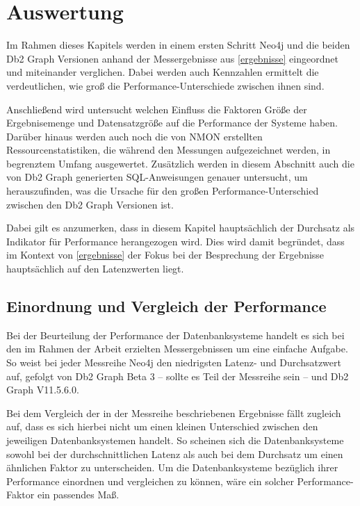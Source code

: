 \chapter{Auswertung}
\label{auswertung}
Im Rahmen dieses Kapitels werden in einem ersten Schritt Neo4j und die beiden Db2 Graph Versionen anhand der Messergebnisse aus \autoref{ergebnisse} eingeordnet und miteinander verglichen. Dabei werden auch Kennzahlen ermittelt die verdeutlichen, wie groß die Performance-Unterschiede zwischen ihnen sind. 

Anschließend wird untersucht welchen Einfluss die Faktoren Größe der Ergebnisemenge und Datensatzgröße auf die Performance der Systeme haben. Darüber hinaus werden auch noch die von NMON erstellten Ressourcenstatistiken, die während den Messungen aufgezeichnet werden, in begrenztem Umfang ausgewertet. Zusätzlich werden in diesem Abschnitt auch die von Db2 Graph generierten SQL-Anweisungen genauer untersucht, um herauszufinden, was die Ursache für den großen Performance-Unterschied zwischen den Db2 Graph Versionen ist.

Dabei gilt es anzumerken, dass in diesem Kapitel hauptsächlich der Durchsatz als Indikator für Performance herangezogen wird. Dies wird damit begründet, dass im Kontext von \autoref{ergebnisse} der Fokus bei der Besprechung der Ergebnisse hauptsächlich auf den Latenzwerten liegt.

\section{Einordnung und Vergleich der Performance}
\label{auswertung:einordnung}
Bei der Beurteilung der Performance der Datenbanksysteme handelt es sich bei den im Rahmen der Arbeit erzielten Messergebnissen um eine einfache Aufgabe. So weist bei jeder Messreihe Neo4j den niedrigsten Latenz- und Durchsatzwert auf, gefolgt von Db2 Graph Beta 3 -- sollte es Teil der Messreihe sein -- und Db2 Graph V11.5.6.0. 

Bei dem Vergleich der in der Messreihe beschriebenen Ergebnisse fällt zugleich auf, dass es sich hierbei nicht um einen kleinen Unterschied zwischen den jeweiligen Datenbanksystemen handelt. So scheinen sich die Datenbanksysteme sowohl bei der durchschnittlichen Latenz als auch bei dem Durchsatz um einen ähnlichen Faktor zu unterscheiden. Um die Datenbanksysteme bezüglich ihrer Performance einordnen und vergleichen zu können, wäre ein solcher Performance-Faktor ein passendes Maß. 

